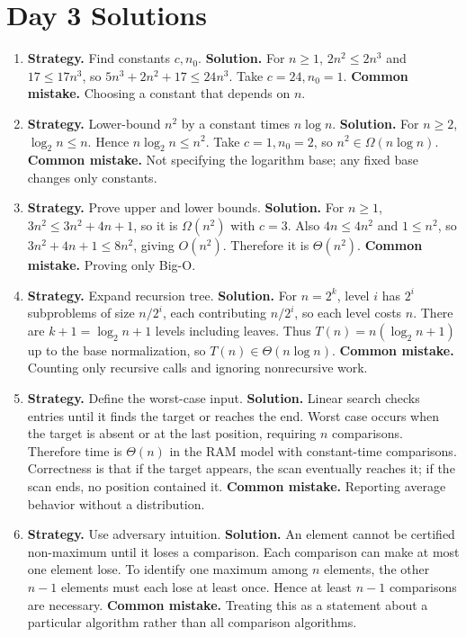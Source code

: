 \documentclass[11pt]{article}
\begin{document}
\section{Day 3 Solutions}
\begin{enumerate}[label=\textbf{3.\arabic*.}]
\item \textbf{Strategy.} Find constants $c,n_0$. \textbf{Solution.} For $n\ge1$, $2n^2\le2n^3$ and $17\le17n^3$, so $5n^3+2n^2+17\le24n^3$. Take $c=24,n_0=1$. \textbf{Common mistake.} Choosing a constant that depends on $n$.

\item \textbf{Strategy.} Lower-bound $n^2$ by a constant times $n\log n$. \textbf{Solution.} For $n\ge2$, $\log_2 n\le n$. Hence $n\log_2 n\le n^2$. Take $c=1,n_0=2$, so $n^2\in\Omega(n\log n)$. \textbf{Common mistake.} Not specifying the logarithm base; any fixed base changes only constants.

\item \textbf{Strategy.} Prove upper and lower bounds. \textbf{Solution.} For $n\ge1$, $3n^2\le3n^2+4n+1$, so it is $\Omega(n^2)$ with $c=3$. Also $4n\le4n^2$ and $1\le n^2$, so $3n^2+4n+1\le8n^2$, giving $O(n^2)$. Therefore it is $\Theta(n^2)$. \textbf{Common mistake.} Proving only Big-O.

\item \textbf{Strategy.} Expand recursion tree. \textbf{Solution.} For $n=2^k$, level $i$ has $2^i$ subproblems of size $n/2^i$, each contributing $n/2^i$, so each level costs $n$. There are $k+1=\log_2 n+1$ levels including leaves. Thus $T(n)=n(\log_2 n+1)$ up to the base normalization, so $T(n)\in\Theta(n\log n)$. \textbf{Common mistake.} Counting only recursive calls and ignoring nonrecursive work.

\item \textbf{Strategy.} Define the worst-case input. \textbf{Solution.} Linear search checks entries until it finds the target or reaches the end. Worst case occurs when the target is absent or at the last position, requiring $n$ comparisons. Therefore time is $\Theta(n)$ in the RAM model with constant-time comparisons. Correctness is that if the target appears, the scan eventually reaches it; if the scan ends, no position contained it. \textbf{Common mistake.} Reporting average behavior without a distribution.

\item \textbf{Strategy.} Use adversary intuition. \textbf{Solution.} An element cannot be certified non-maximum until it loses a comparison. Each comparison can make at most one element lose. To identify one maximum among $n$ elements, the other $n-1$ elements must each lose at least once. Hence at least $n-1$ comparisons are necessary. \textbf{Common mistake.} Treating this as a statement about a particular algorithm rather than all comparison algorithms.
\end{enumerate}
\end{document}

